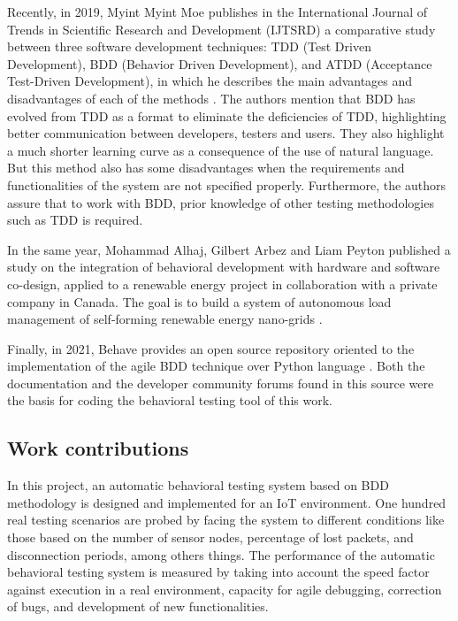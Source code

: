 \documentclass[journal]{IEEEtran}	%
\begin{document}
Recently, in 2019, Myint Myint Moe publishes in the International Journal of Trends in Scientific Research and Development (IJTSRD) a comparative study between three software development techniques: TDD (Test Driven Development), BDD (Behavior Driven Development), and ATDD (Acceptance Test-Driven Development), in which he describes the main advantages and disadvantages of each of the methods \cite{moe2019comparative}. The authors mention that BDD has evolved from TDD as a format to eliminate the deficiencies of TDD, highlighting better communication between developers, testers and users. They also highlight a much shorter learning curve as a consequence of the use of natural language. But this method also has some disadvantages when the requirements and functionalities of the system are not specified properly. Furthermore, the authors assure that to work with BDD, prior knowledge of other testing methodologies such as TDD is required.

In the same year, Mohammad Alhaj, Gilbert Arbez and Liam Peyton published a study on the integration of behavioral development with hardware and software co-design, applied to a renewable energy project in collaboration with a private company in Canada. The goal is to build a system of autonomous load management of self-forming renewable energy nano-grids \cite{alhajapproach}.

Finally, in 2021, Behave provides an open source repository oriented to the implementation of the agile BDD technique over Python language \cite{behave2021github}. Both the documentation and the developer community forums found in this source were the basis for coding the behavioral testing tool of this work.


\subsection{Work contributions}

In this project, an automatic behavioral testing system based on BDD methodology is designed and implemented for an IoT environment. One hundred real testing scenarios are probed by facing the system to different conditions like those based on the number of sensor nodes, percentage of lost packets, and disconnection periods, among others things. The performance of the automatic behavioral testing system is measured by taking into account the speed factor against execution in a real environment, capacity for agile debugging, correction of bugs, and development of new functionalities.
\end{document}

